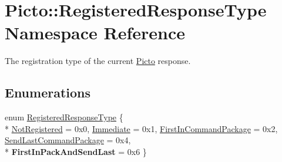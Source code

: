 \hypertarget{namespace_picto_1_1_registered_response_type}{\section{Picto\-:\-:Registered\-Response\-Type Namespace Reference}
\label{namespace_picto_1_1_registered_response_type}
}


The registration type of the current \hyperlink{namespace_picto}{Picto} response.  


\subsection*{Enumerations}
\begin{DoxyCompactItemize}
\item 
enum \hyperlink{namespace_picto_1_1_registered_response_type_abc60624d7d7b5a5d029fdaf2404311d2}{Registered\-Response\-Type} \{ \\*
\hyperlink{namespace_picto_1_1_registered_response_type_abc60624d7d7b5a5d029fdaf2404311d2af54745285b7dc318c71a812af572842f}{Not\-Registered} = 0x0, 
\hyperlink{namespace_picto_1_1_registered_response_type_abc60624d7d7b5a5d029fdaf2404311d2a4599296bd74ceb907b8b73da07ed5d04}{Immediate} = 0x1, 
\hyperlink{namespace_picto_1_1_registered_response_type_abc60624d7d7b5a5d029fdaf2404311d2afa5b8e09071330ae9cd04907a7abb174}{First\-In\-Command\-Package} = 0x2, 
\hyperlink{namespace_picto_1_1_registered_response_type_abc60624d7d7b5a5d029fdaf2404311d2a05e7bf540c641f55b7cb237ad5f46161}{Send\-Last\-Command\-Package} = 0x4, 
\\*
{\bfseries First\-In\-Pack\-And\-Send\-Last} = 0x6
 \}
\end{DoxyCompactItemize}


